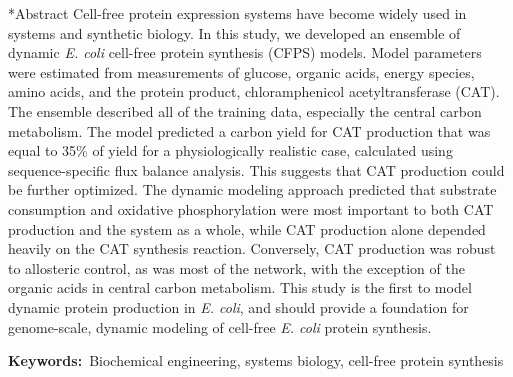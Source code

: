 \documentclass[12pt]{article}
\makeatletter
\renewcommand\section{\@startsection
	{subsection}{2}{0mm}
	{-0.2in}
	{0.05\baselineskip}
	{\normalfont\large\bfseries}}
\makeatother
\begin{document}
\section*{Abstract}
Cell-free protein expression systems have become widely used in systems and synthetic biology.
In this study, we developed an ensemble of dynamic \textit{E. coli} cell-free protein synthesis (CFPS) models.
Model parameters were estimated from measurements of glucose, organic acids, energy species, amino acids, and the protein product, chloramphenicol acetyltransferase (CAT).
The ensemble described all of the training data, especially the central carbon metabolism.
The model predicted a carbon yield for CAT production that was equal to 35\% of yield for a physiologically realistic case, calculated using sequence-specific flux balance analysis.
This suggests that CAT production could be further optimized.
The dynamic modeling approach predicted that substrate consumption and oxidative phosphorylation were most important to both CAT production and the system as a whole, while CAT production alone depended heavily on the CAT synthesis reaction.
Conversely, CAT production was robust to allosteric control, as was most of the network, with the exception of the organic acids in central carbon metabolism.
This study is the first to model dynamic protein production in \textit{E. coli}, and should provide a foundation for genome-scale,
dynamic modeling of cell-free \textit{E. coli} protein synthesis.

\vspace{0.1in}
{\noindent \textbf{Keywords:}~Biochemical engineering, systems biology, cell-free protein synthesis}

\pagebreak

\setcounter{page}{1}


\linenumbers
\end{document}

